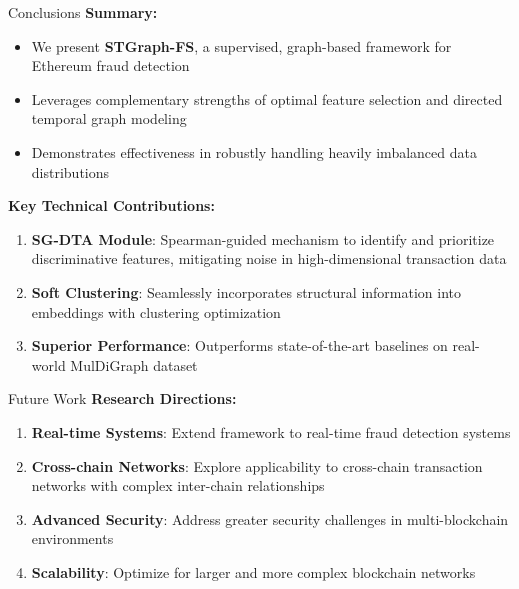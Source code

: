 \documentclass{beamer}
\begin{document}
\begin{frame}{Conclusions}
    \textbf{Summary:}
    \begin{itemize}
        \item We present \textbf{STGraph-FS}, a supervised, graph-based framework for Ethereum fraud detection
        \item Leverages complementary strengths of optimal feature selection and directed temporal graph modeling
        \item Demonstrates effectiveness in robustly handling heavily imbalanced data distributions
    \end{itemize}
    
    \vspace{0.5cm}
    \textbf{Key Technical Contributions:}
    \begin{enumerate}
        \item \textbf{SG-DTA Module}: Spearman-guided mechanism to identify and prioritize discriminative features, mitigating noise in high-dimensional transaction data
        \item \textbf{Soft Clustering}: Seamlessly incorporates structural information into embeddings with clustering optimization
        \item \textbf{Superior Performance}: Outperforms state-of-the-art baselines on real-world MulDiGraph dataset
    \end{enumerate}
\end{frame}

\begin{frame}{Future Work}
    \textbf{Research Directions:}
    \begin{enumerate}
        \item \textbf{Real-time Systems}: Extend framework to real-time fraud detection systems
        \item \textbf{Cross-chain Networks}: Explore applicability to cross-chain transaction networks with complex inter-chain relationships  
        \item \textbf{Advanced Security}: Address greater security challenges in multi-blockchain environments
        \item \textbf{Scalability}: Optimize for larger and more complex blockchain networks
    \end{enumerate}
    
    \vspace{0.5cm}
\end{frame}


    
    
    
    
    
\end{document}
